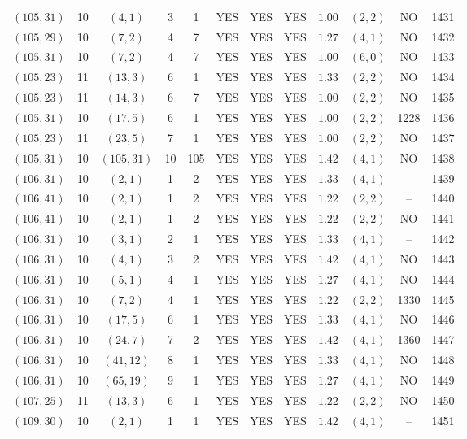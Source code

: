 \begin{longtable}{|c|c|c|c|c|c|c|c|c|c|c|c|}
$(105,31)$ & 10 & $(4,1)$ & 3 & 1 & YES & YES & YES & $1.00$ & $(2,2)$ & NO & 1431\\
$(105,29)$ & 10 & $(7,2)$ & 4 & 7 & YES & YES & YES & $1.27$ & $(4,1)$ & NO & 1432\\
$(105,31)$ & 10 & $(7,2)$ & 4 & 7 & YES & YES & YES & $1.00$ & $(6,0)$ & NO & 1433\\
$(105,23)$ & 11 & $(13,3)$ & 6 & 1 & YES & YES & YES & $1.33$ & $(2,2)$ & NO & 1434\\
$(105,23)$ & 11 & $(14,3)$ & 6 & 7 & YES & YES & YES & $1.00$ & $(2,2)$ & NO & 1435\\
$(105,31)$ & 10 & $(17,5)$ & 6 & 1 & YES & YES & YES & $1.00$ & $(2,2)$ & 1228 & 1436\\
$(105,23)$ & 11 & $(23,5)$ & 7 & 1 & YES & YES & YES & $1.00$ & $(2,2)$ & NO & 1437\\
$(105,31)$ & 10 & $(105,31)$ & 10 & 105 & YES & YES & YES & $1.42$ & $(4,1)$ & NO & 1438\\
$(106,31)$ & 10 & $(2,1)$ & 1 & 2 & YES & YES & YES & $1.33$ & $(4,1)$ & -- & 1439\\
$(106,41)$ & 10 & $(2,1)$ & 1 & 2 & YES & YES & YES & $1.22$ & $(2,2)$ & -- & 1440\\
$(106,41)$ & 10 & $(2,1)$ & 1 & 2 & YES & YES & YES & $1.22$ & $(2,2)$ & NO & 1441\\
$(106,31)$ & 10 & $(3,1)$ & 2 & 1 & YES & YES & YES & $1.33$ & $(4,1)$ & -- & 1442\\
$(106,31)$ & 10 & $(4,1)$ & 3 & 2 & YES & YES & YES & $1.42$ & $(4,1)$ & NO & 1443\\
$(106,31)$ & 10 & $(5,1)$ & 4 & 1 & YES & YES & YES & $1.27$ & $(4,1)$ & NO & 1444\\
$(106,31)$ & 10 & $(7,2)$ & 4 & 1 & YES & YES & YES & $1.22$ & $(2,2)$ & 1330 & 1445\\
$(106,31)$ & 10 & $(17,5)$ & 6 & 1 & YES & YES & YES & $1.33$ & $(4,1)$ & NO & 1446\\
$(106,31)$ & 10 & $(24,7)$ & 7 & 2 & YES & YES & YES & $1.42$ & $(4,1)$ & 1360 & 1447\\
$(106,31)$ & 10 & $(41,12)$ & 8 & 1 & YES & YES & YES & $1.33$ & $(4,1)$ & NO & 1448\\
$(106,31)$ & 10 & $(65,19)$ & 9 & 1 & YES & YES & YES & $1.27$ & $(4,1)$ & NO & 1449\\
$(107,25)$ & 11 & $(13,3)$ & 6 & 1 & YES & YES & YES & $1.22$ & $(2,2)$ & NO & 1450\\
$(109,30)$ & 10 & $(2,1)$ & 1 & 1 & YES & YES & YES & $1.42$ & $(4,1)$ & -- & 1451\\

\end{longtable}
